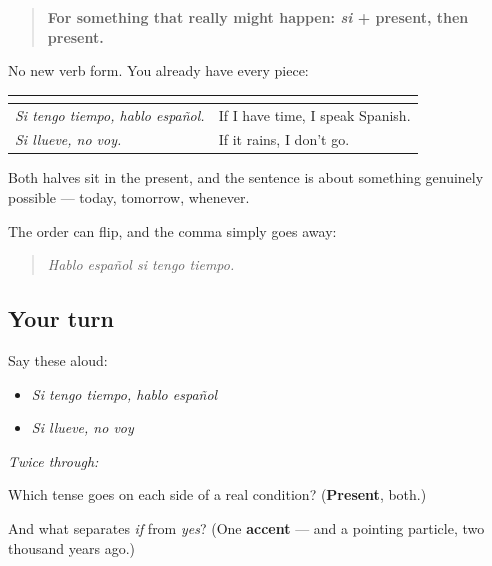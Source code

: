 \begin{grammarlens}[title={Grammar Lens: the real condition}]
\begin{quote}
\textbf{For something that really might happen: \emph{si} + present, then present.}
\end{quote}

No new verb form. You already have every piece:

\noindent
\begin{tabularx}{\linewidth}{@{}>{\raggedright\arraybackslash}X>{\raggedright\arraybackslash}X@{}}
\toprule
\textbf{} & \textbf{} \\
\midrule
\emph{Si tengo tiempo, hablo español.} & If I have time, I speak Spanish. \\
\emph{Si llueve, no voy.} & If it rains, I don't go. \\
\bottomrule
\end{tabularx}

Both halves sit in the present, and the sentence is about something genuinely possible — today, tomorrow, whenever.

The order can flip, and the comma simply goes away:

\begin{quote}
\emph{Hablo español si tengo tiempo.}
\end{quote}
\end{grammarlens}

\subsection*{Your turn}
Say these aloud:

\begin{itemize}
\raggedright
  \item \emph{Si tengo tiempo, hablo español}
  \item \emph{Si llueve, no voy}
\end{itemize}

\emph{Twice through:}

\begin{tcolorbox}[breakable,colback=teal!4,colframe=teal!35!black,title={Before you move on}]
Which tense goes on each side of a real condition? (\textbf{Present}, both.)

And what separates \emph{if} from \emph{yes}? (One \textbf{accent} — and a pointing particle, two thousand years ago.)
\end{tcolorbox}
